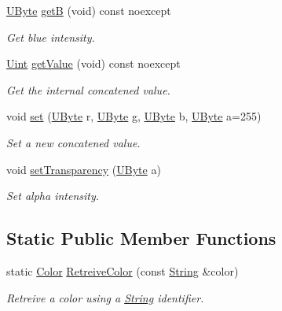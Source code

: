 \begin{DoxyCompactItemize}
\mbox{\hyperlink{namespaceo_a_a8c38e43a304d568b8495770dd8d50513}{U\+Byte}} \mbox{\hyperlink{classo_a_1_1_color_a8a30e79da1de484a4ff47ed2bcbc8e23}{getB}} (void) const noexcept
\begin{DoxyCompactList}\small\item\em Get blue intensity. \end{DoxyCompactList}\item 
\mbox{\hyperlink{namespaceo_a_abe1d8250226c5cf34f84d7b75fc7922e}{Uint}} \mbox{\hyperlink{classo_a_1_1_color_ac010d6318a14cebb3123929159fbab93}{get\+Value}} (void) const noexcept
\begin{DoxyCompactList}\small\item\em Get the internal concatened value. \end{DoxyCompactList}\item 
void \mbox{\hyperlink{classo_a_1_1_color_aaf0ba215d5bd4946f93a68bab2a8d66d}{set}} (\mbox{\hyperlink{namespaceo_a_a8c38e43a304d568b8495770dd8d50513}{U\+Byte}} r, \mbox{\hyperlink{namespaceo_a_a8c38e43a304d568b8495770dd8d50513}{U\+Byte}} g, \mbox{\hyperlink{namespaceo_a_a8c38e43a304d568b8495770dd8d50513}{U\+Byte}} b, \mbox{\hyperlink{namespaceo_a_a8c38e43a304d568b8495770dd8d50513}{U\+Byte}} a=255)
\begin{DoxyCompactList}\small\item\em Set a new concatened value. \end{DoxyCompactList}\item 
void \mbox{\hyperlink{classo_a_1_1_color_afa261cb70221d211e94a29b8f0484a02}{set\+Transparency}} (\mbox{\hyperlink{namespaceo_a_a8c38e43a304d568b8495770dd8d50513}{U\+Byte}} a)
\begin{DoxyCompactList}\small\item\em Set alpha intensity. \end{DoxyCompactList}\end{DoxyCompactItemize}
\subsection*{Static Public Member Functions}
\begin{DoxyCompactItemize}
\item 
static \mbox{\hyperlink{classo_a_1_1_color}{Color}} \mbox{\hyperlink{classo_a_1_1_color_ae637744de31ea0e978b58a836db49884}{Retreive\+Color}} (const \mbox{\hyperlink{classo_a_1_1_string}{String}} \&color)
\begin{DoxyCompactList}\small\item\em Retreive a color using a \mbox{\hyperlink{classo_a_1_1_string}{String}} identifier. \end{DoxyCompactList}\end{DoxyCompactItemize}


